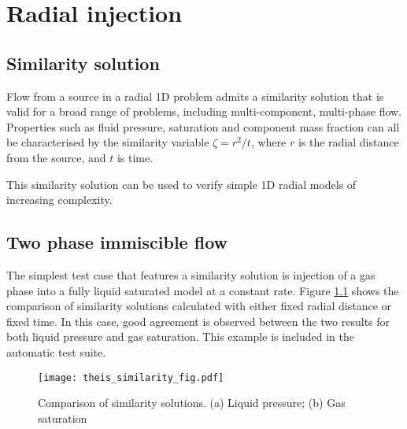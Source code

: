 \chapter{Radial injection}
\section{Similarity solution}

Flow from a source in a radial 1D problem admits a similarity solution that is valid for a
broad range of problems, including multi-component, multi-phase flow. Properties such as fluid
pressure, saturation and component mass fraction can all be characterised by the similarity
variable $\zeta = r^2/t$, where $r$ is the radial distance from the source, and $t$ is time.

This similarity solution can be used to verify simple 1D radial models of increasing complexity.

\section{Two phase immiscible flow}

The simplest test case that features a similarity solution is injection of a gas phase into a fully liquid
saturated model at a constant rate. Figure \ref{fig:theis_similarity_fig} shows the comparison of
similarity solutions calculated with either fixed radial distance or fixed time. In this case, good agreement
is observed between the two results for both liquid pressure and gas saturation. This example is included
in the automatic test suite.

\begin{figure}[htb]
\centering
\texttt{[image: theis\_similarity\_fig.pdf]}
\caption{Comparison of similarity solutions. (a) Liquid pressure; (b) Gas saturation}
\label{fig:theis_similarity_fig}
\end{figure}

